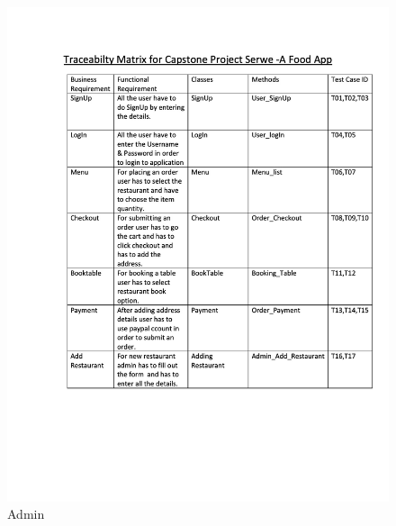 \documentclass[12pt]{article}
\begin{document}
\begin{figure}
\centering
\includegraphics[scale=0.4]{matrix.jpg}
\caption{Admin}

\end{figure}









































\end{document}
